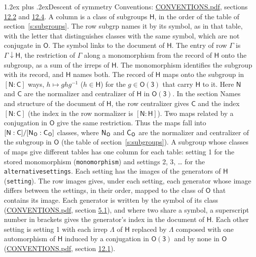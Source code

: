 \documentclass[10pt,a4paper]{article}
\makeatletter
\renewcommand\section{\@startsection{section}{1}{\z@}{-3ex plus -1ex minus -.2ex}%
  {1.2ex plus .2ex}{\normalfont\large\sffamily\bfseries\color{parttitle}}}
\numberwithin{equation}{section}
\newcommand{\grp}[1]{\mathsf{#1}}
\newcommand{\grpindex}[2]{[#1 : #2]}
\newcommand{\restr}[2]{#1\!\downarrow#2}
\newcommand{\hairsp}{\mkern1mu}
\makeatother
\begin{document}
\section{Descent of symmetry}\label{s:subduction}
Conventions: \href{../../CONVENTIONS.pdf}{CONVENTIONS.pdf}, sections \href{../../CONVENTIONS.pdf\#conv.12.2}{12.2} and \href{../../CONVENTIONS.pdf\#conv.12.4}{12.4}.
A column is a class of subgroups $\grp{H}$, in the order of the table of section~\ref{s:subgroups}. The row subgrp names it by its symbol, as in that table, with the letter that distinguishes classes with the same symbol, which are not conjugate in $\grp{O}$. The symbol links to the document of $\grp{H}$. The entry of row $\Gamma$ is $\restr{\Gamma}{\grp{H}}$, the restriction of $\Gamma$ along a monomorphism from the record of $\grp{H}$ onto the subgroup, as a sum of the irreps of $\grp{H}$. The monomorphism identifies the subgroup with its record, and $\grp{H}$ names both. \label{n:group.normalizer.o3}\label{n:group.centralizer.o3}The record of $\grp{H}$ maps onto the subgroup in $\grpindex{\grp{N}}{\grp{C}}$ ways, $h \mapsto g h g^{-1}$ ($h \in \grp{H}$) for the $g \in \grp{O(3)}$ that carry $\grp{H}$ to it. Here $\grp{N}$ and $\grp{C}$ are the normalizer and centralizer of $\grp{H}$ in \href{O3.pdf}{$\grp{O(3)}$}. In the section Names and structure of the document of $\grp{H}$, the row centralizer gives $\grp{C}$ and the index $\grpindex{\grp{N}}{\grp{C}}$ (the index in the row normalizer is $\grpindex{\grp{N}}{\grp{H}}$). Two maps related by a conjugation in $\grp{O}$ give the same restriction. Thus the maps fall into $\grpindex{\grp{N}}{\grp{C}}/\grpindex{\grp{N}_{\hairsp \grp{O}}}{\grp{C}_{\hairsp \grp{O}}}$ classes, where $\grp{N}_{\hairsp \grp{O}}$ and $\grp{C}_{\hairsp \grp{O}}$ are the normalizer and centralizer of the subgroup in $\grp{O}$ (the table of section~\ref{s:subgroups}). \label{n:head.setting}A subgroup whose classes of maps give different tables has one column for each table: setting 1 for the stored monomorphism (\texttt{monomorphism}) and settings 2, 3, \dots{} for the \texttt{alternativesettings}. Each setting has the images of the generators of $\grp{H}$ (\texttt{setting}). \label{n:head.images}The row images gives, under each setting, each generator whose image differs between the settings, in their order, mapped to the class of $\grp{O}$ that contains its image. \label{n:element.generator.index}Each generator is written by the symbol of its class (\href{../../CONVENTIONS.pdf}{CONVENTIONS.pdf}, section \href{../../CONVENTIONS.pdf\#conv.5.1}{5.1}), and where two share a symbol, a superscript number in brackets gives the generator's index in the document of $\grp{H}$. \label{n:irrep.Delta}Each other setting is setting 1 with each irrep $\Lambda$ of $\grp{H}$ replaced by $\Lambda$ composed with one automorphism of $\grp{H}$ induced by a conjugation in \href{O3.pdf}{$\grp{O(3)}$} and by none in $\grp{O}$ (\href{../../CONVENTIONS.pdf}{CONVENTIONS.pdf}, section \href{../../CONVENTIONS.pdf\#conv.12.1}{12.1}).
\end{document}
